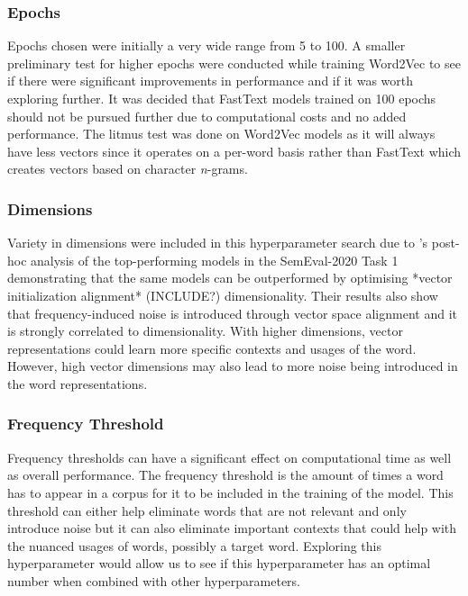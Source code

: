 \subsubsection{Epochs} \label{exp-epochs}
Epochs chosen were initially a very wide range from 5 to 100. A smaller preliminary test for higher epochs were conducted while training Word2Vec to see if there were significant improvements in performance and if it was worth exploring further. It was decided that FastText models trained on 100 epochs should not be pursued further due to computational costs and no added performance. The litmus test was done on Word2Vec models as it will always have less vectors since it operates on a per-word basis rather than FastText which creates vectors based on character \emph{n}-grams. 

\subsubsection{Dimensions}
Variety in dimensions were included in this hyperparameter search due to \citet{kaiser-etal-2020-ims}’s post-hoc analysis of the top-performing models in the SemEval-2020 Task 1 demonstrating that the same models can be outperformed by optimising *vector initialization alignment* (INCLUDE?) dimensionality. Their results also show that frequency-induced noise is introduced through vector space alignment and it is strongly correlated to dimensionality. With higher dimensions, vector representations could learn more specific contexts and usages of the word. However, high vector dimensions may also lead to more noise being introduced in the word representations. 

\subsubsection{Frequency Threshold}
Frequency thresholds can have a significant effect on computational time as well as overall performance. The frequency threshold is the amount of times a word has to appear in a corpus for it to be included in the training of the model. This threshold can either help eliminate words that are not relevant and only introduce noise but it can also eliminate important contexts that could help with the nuanced usages of words, possibly a target word. Exploring this hyperparameter would allow us to see if this hyperparameter has an optimal number when combined with other hyperparameters. 

